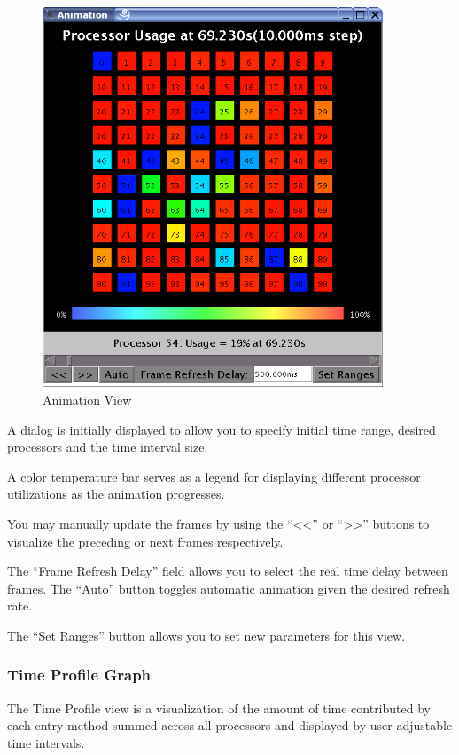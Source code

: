 \documentclass[10pt]{article}
\begin{document}
\begin{figure}[htb]
\center
\includegraphics[width=4.0in]{fig/animation}
\caption{Animation View}
\label{animation}
\end{figure}

A dialog is initially displayed to allow you to specify initial time
range, desired processors and the time interval size.

A color temperature bar serves as a legend for displaying different
processor utilizations as the animation progresses.

You may manually update the frames by using the ``<<'' or ``>>''
buttons to visualize the preceding or next frames respectively.

The ``Frame Refresh Delay'' field allows you to select the real time
delay between frames. The ``Auto'' button toggles automatic animation
given the desired refresh rate.

The ``Set Ranges'' button allows you to set new parameters for this
view.

\subsubsection{Time Profile Graph}

The Time Profile view is a visualization of the amount of time
contributed by each entry method summed across all processors and
displayed by user-adjustable time intervals.
\end{document}
